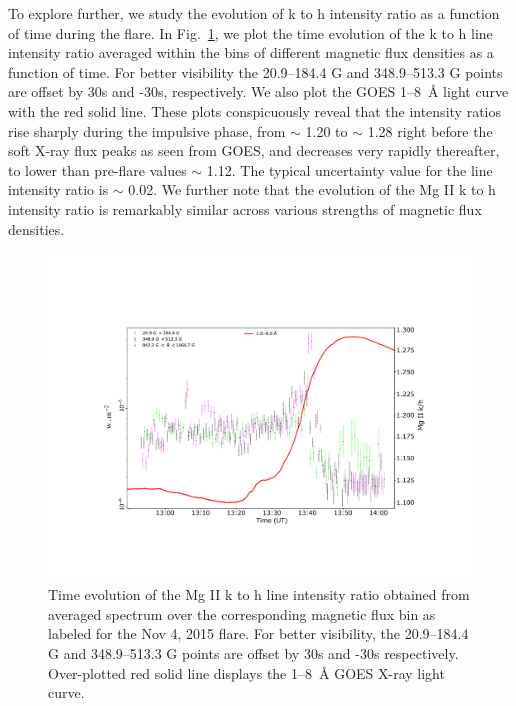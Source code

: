 To explore further, we study the evolution of k to h intensity ratio as a function of time during the flare. In Fig.~\ref{fig:optical_dep_ev_m}, we plot the time evolution of the k to h line intensity ratio averaged within the bins of different magnetic flux densities as a function of time. For better visibility the 20.9{--}184.4 G and 348.9{--}513.3 G points are offset by 30s and -30s, respectively. We also plot the GOES 1{--}8~{\AA} light curve with the red solid line. These plots conspicuously reveal that the intensity ratios rise sharply during the impulsive phase, from $\sim$ 1.20 to $\sim$ 1.28 right before the soft X-ray flux peaks as seen from GOES, and decreases very rapidly thereafter, to lower than pre-flare values $\sim$ 1.12. The typical uncertainty value for the line intensity ratio is $\sim$ 0.02. We further note that the evolution of the Mg II k to h intensity ratio is remarkably similar across various strengths of magnetic flux densities.

\begin{figure}[ht!]
    \centering
    \includegraphics[trim={3cm 3cm 2cm 4cm},clip,width=\textwidth]{Figures/Nov-11-2015-optical-dep-ev-5.pdf}
    \caption{Time evolution of the Mg II k to h line intensity ratio obtained from averaged spectrum over the corresponding magnetic flux bin as labeled for the Nov 4, 2015 flare. For better visibility, the 20.9{--}184.4 G and 348.9{--}513.3 G points are offset by 30s and -30s respectively. Over-plotted red solid line displays the 1{--}8~{\AA} GOES X-ray light curve.}
    \label{fig:optical_dep_ev_m}
\end{figure}

